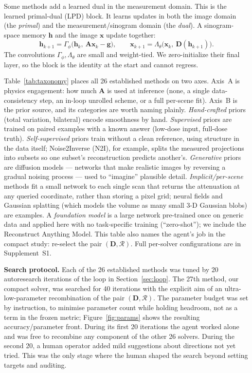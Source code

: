 \documentclass[AMA,twocolumn]{USG} %
\begin{document}
Some methods add a learned dual in the measurement domain. This is the learned primal-dual (LPD) block.\cite{adler2018lpd} It learns updates in both the image domain (the \emph{primal}) and the measurement/sinogram domain (the \emph{dual}). A sinogram-space memory $\mathbf{h}$ and the image $\mathbf{x}$ update together:
\begin{equation}\label{eq:lpd}
\mathbf{h}_{k+1}=\Gamma_\phi\!\big(\mathbf{h}_k,\ \mathbf{A}\mathbf{x}_k-\mathbf{g}\big),\qquad \mathbf{x}_{k+1}=\Lambda_\theta\!\big(\mathbf{x}_k,\ \mathbf{D}(\mathbf{h}_{k+1})\big).
\end{equation}
The convolutions $\Gamma_\phi,\Lambda_\theta$ are small and weight-tied. We zero-initialize their final layer, so the block is the identity at the start and cannot regress.

Table~\ref{tab:taxonomy} places all 26 established methods on two axes. Axis~A is physics engagement: how much $\mathbf{A}$ is used at inference (none, a single data-consistency step, an in-loop unrolled scheme, or a full per-scene fit). Axis~B is the prior source, and its categories are worth naming plainly. \emph{Hand-crafted} priors (total variation, bilateral) encode smoothness by hand. \emph{Supervised} priors are trained on paired examples with a known answer (low-dose input, full-dose truth). \emph{Self-supervised} priors train without a clean reference, using structure in the data itself; Noise2Inverse (N2I), for example, splits the measured projections into subsets so one subset's reconstruction predicts another's. \emph{Generative} priors are diffusion models --- networks that make realistic images by reversing a gradual noising process --- used to ``imagine'' plausible detail. \emph{Implicit/per-scene} methods fit a small network to each single scan that returns the attenuation at any queried coordinate, rather than storing a pixel grid; neural fields and Gaussian splatting (which models the volume as many small 3-D Gaussian blobs) are examples. A \emph{foundation model} is a large network pre-trained once on generic data and applied here with no task-specific training (``zero-shot''); we include the Reconstruct Anything Model.\cite{terris2025ram} This table also names the agent's job in the compact study: re-select the pair $(\mathbf{D},\mathcal{R})$. Full per-solver configurations are in Supplement~S1.

\textbf{Search protocol.} Each of the 26 established methods was tuned by 20 autoresearch iterations of the loop in Section~\ref{sec:loop}. The 27th method, our compact solver, was searched for 40 iterations with the explicit aim of an ultra-low-parameter recombination of the pair $(\mathbf{D},\mathcal{R})$. The parameter budget was set by instruction, to minimise parameter count while holding headroom, not as a term in the frozen metric; Figure~\ref{fig:params} shows the resulting accuracy/parameter front. During its first 20 iterations the agent worked alone and was free to recombine any component of the other 26 solvers. During the second 20, a human operator added mild suggestions about directions not yet tried. This was the only stage where the human shaped the search beyond setting targets and auditing.
\end{document}
